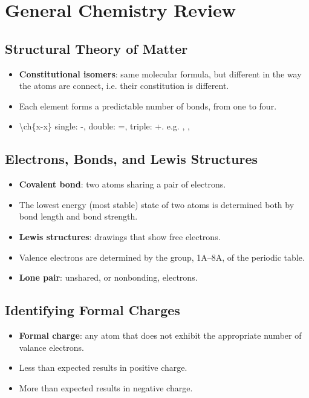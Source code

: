 \documentclass[12pt,a4paper]{article}
\begin{document}
\tableofcontents
\cleardoublepage
\fancyhead{}

\clearpage
{}
\clearpage
\section{General Chemistry Review}
\subsection{Structural Theory of Matter}
\begin{itemize}
    \item \textbf{Constitutional isomers}: same molecular formula, but different in the way the atoms are connect, i.e. their constitution is different.
    \item Each element forms a predictable number of bonds, from one to four.
    \item \textbackslash ch\{x-x\} single: -, double: =, triple: +. e.g. , , 
\end{itemize}

\subsection{Electrons, Bonds, and Lewis Structures}
\begin{itemize}
    \item \textbf{Covalent bond}: two atoms sharing a pair of electrons.
    \item The lowest energy (most stable) state of two atoms is determined both by bond length and bond strength.
    \item \textbf{Lewis structures}: drawings that show free electrons.
    \item Valence electrons are determined by the group, 1A--8A, of the periodic table.
    \item \textbf{Lone pair}: unshared, or nonbonding, electrons.
\end{itemize}

\subsection{Identifying Formal Charges}
\begin{itemize}
    \item \textbf{Formal charge}: any atom that does not exhibit the appropriate number of valance electrons. 
    \item {\color{pos}Less} than expected results in {\color{pos} positive} charge.
    \item {\color{neg}More} than expected results in {\color{neg}negative} charge.
\end{itemize}
\end{document}
